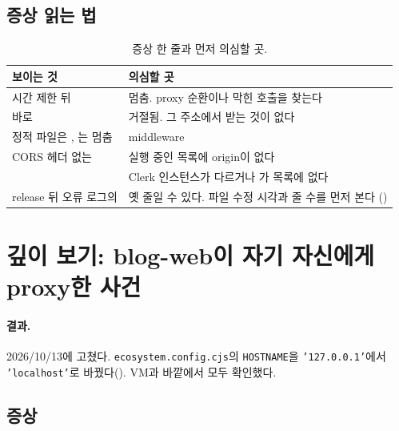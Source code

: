 \subsection{증상 읽는 법}\label{sec:dbg-reading}

\begin{table}[H]
  \caption{증상 한 줄과 먼저 의심할 곳.}
  \label{tab:dbg-reading}
  \centering\small
  \begin{tabularx}{\linewidth}{@{}L{5.2cm}Y@{}}
    \toprule
    보이는 것 & 의심할 곳 \\
    \midrule
    시간 제한 뒤  & 멈춤. proxy 순환이나 막힌 호출을 찾는다 \\
    \midrule
    바로  & 거절됨. 그 주소에서 받는 것이 없다 \\
    \midrule
    정적 파일은 , \code{/}는 멈춤 & middleware \\
    \midrule
    CORS 헤더 없는  & 실행 중인 목록에 origin이 없다 \\
    \midrule
     & Clerk 인스턴스가 다르거나 가 목록에 없다 \\
    \midrule
    release 뒤 오류 로그의  & 옛 줄일 수 있다. 파일 수정 시각과 줄 수를 먼저 본다 () \\
    \bottomrule
  \end{tabularx}
\end{table}

\section{깊이 보기: blog-web이 자기 자신에게 proxy한 사건}\label{sec:dbg-selfproxy}

\paragraph{결과.}
2026/10/13에 고쳤다.
\texttt{ecosystem.config.cjs}의 \texttt{HOSTNAME}을 \texttt{'127.0.0.1'}에서 \texttt{'localhost'}로 바꿨다().
VM과 바깥에서 모두 확인했다.

\subsection{증상}\label{sec:dbg-sp-symptom}

